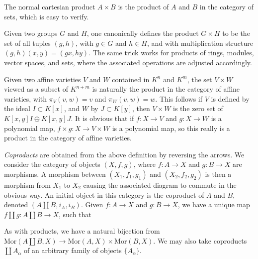 \begin{example}
    The normal cartesian product $A \times B$ is the product of $A$ and $B$ in the category of sets, which is easy to verify.
\end{example}

\begin{example}
    Given two groups $G$ and $H$, one canonically defines the product $G \times H$ to be the set of all tuples $(g,h)$, with $g \in G$ and $h \in H$, and with multiplication structure $(g,h)(x,y) = (gx,hy)$. The same trick works for products of rings, modules, vector spaces, and sets, where the associated operations are adjusted accordingly.
\end{example}

\begin{example}
    Given two affine varieties $V$ and $W$ contained in $K^n$ and $K^m$, the set $V \times W$ viewed as a subset of $K^{n+m}$ is naturally the product in the category of affine varieties, with $\pi_V(v,w) = v$ and $\pi_W(v,w) = w$. This follows if $V$ is defined by the ideal $I \subset K[x]$, and $W$ by $J \subset K[y]$, then $V \times W$ is the zero set of $K[x,y]I \oplus K[x,y]J$. It is obvious that if $f: X \to V$ and $g: X \to W$ is a polynomial map, $f \times g: X \to V \times W$ is a polynomial map, so this really is a product in the category of affine varieties.
\end{example}

\emph{Coproducts} are obtained from the above definition by reversing the arrows. We consider the category of objects $(X,f,g)$, where $f: A \to X$ and $g: B \to X$ are morphisms. A morphism between $(X_1,f_1,g_1)$ and $(X_2,f_2,g_2)$ is then a morphism from $X_1$ to $X_2$ causing the associated diagram to commute in the obvious way. An initial object in this category is the coproduct of $A$ and $B$, denoted $(A \amalg B, i_A, i_B)$. Given $f: A \to X$ and $g: B \to X$, we have a unique map $f \amalg g: A \amalg B \to X$, such that
%
\begin{center}
\end{center}
%
As with products, we have a natural bijection from $\text{Mor}(A \amalg B,X) \to \text{Mor}(A,X) \times \text{Mor}(B,X)$. We may also take coproducts $\coprod A_\alpha$ of an arbitrary family of objects $\{ A_\alpha \}$.

